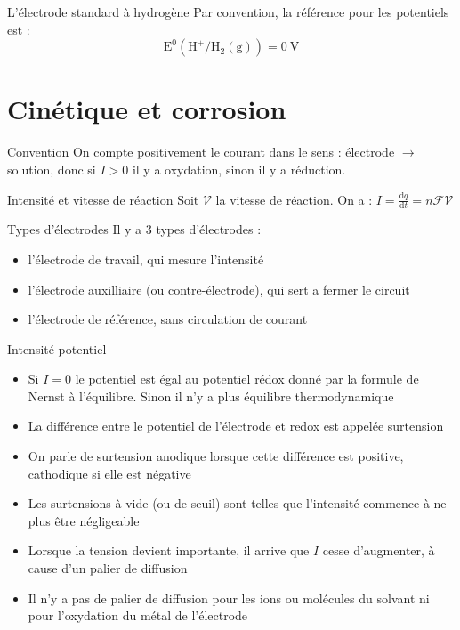 \documentclass[french, a4paper, 11pt, twocolumn]{article}
\begin{document}
    \begin{cadre}{L'électrode standard à hydrogène}
        Par convention, la référence pour les potentiels est :
        \[\mathrm{E^0(H^+/H_2(g))=\SI{0}{\volt}}\]
    \end{cadre}

    \section{Cinétique et corrosion}
    \begin{cadre}{Convention}
        On compte positivement le courant dans le sens : électrode \(\rightarrow\) solution, donc si \(I>0\) il y a oxydation,
        sinon il y a réduction.
    \end{cadre}

    \begin{cadre}{Intensité et vitesse de réaction}
        Soit \(\mathscr{V}\) la vitesse de réaction.
        On a : \(I=\frac{\mathrm{d}q}{\mathrm{d}t}=n\mathcal{F}\mathscr{V}\)
    \end{cadre}

    \begin{cadre}{Types d'électrodes}
        Il y a 3 types d'électrodes :
        \begin{itemize}[label=\(\bullet\)]
            \item l'électrode de travail, qui mesure l'intensité
            \item l'électrode auxilliaire (ou contre-électrode), qui sert a fermer le circuit
            \item l'électrode de référence, sans circulation de courant
        \end{itemize}
    \end{cadre}

    \begin{cadre}{Intensité-potentiel}
        \begin{itemize}[label=\(\bullet\)]
            \item Si \(I=0\) le potentiel est égal au potentiel rédox donné par la formule de Nernst à l'équilibre. Sinon il n'y a plus équilibre thermodynamique
            
            \item La différence entre le potentiel de l'électrode et redox est appelée surtension
            \item On parle de surtension anodique lorsque cette différence est positive, cathodique si elle est négative
            \item Les surtensions à vide (ou de seuil) sont telles que l'intensité commence à ne plus être négligeable
            
            \item Lorsque la tension devient importante, il arrive que \(I\) cesse d'augmenter, à cause d'un palier de diffusion
            \item Il n'y a pas de palier de diffusion pour les ions ou molécules du solvant ni pour l'oxydation du métal de l'électrode
        \end{itemize}
    \end{cadre}
\end{document}

